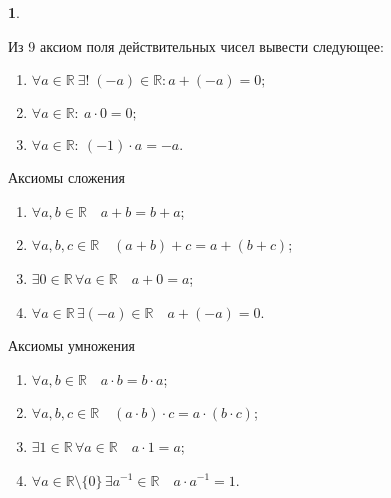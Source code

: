 \documentclass[14pt, a4paper]{extarticle}
\theoremstyle{definition}
\newtheorem{problem}{}
\theoremstyle{definition}
\theoremstyle{remark}
\numberwithin{equation}{section}
\newcommand{\R}{\ensuremath{\mathbb{R}}}
\begin{document}
\begin{problem}
    \begin{multicols}{2}
        Из 9 аксиом поля действительных чисел вывести следующее:
        {
            \renewcommand{\labelenumi}{\alph{enumi})}
            \singlespacing

            \begin{enumerate}
            \item $\forall a \in \R \ \exists ! \; (-a)\in \R : a + (-a) = 0;$
            
            \item $\forall a \in \R : \ a \cdot 0 = 0;$
            
            \item $\forall a \in \R : \ (-1) \cdot a = -a.$
            \end{enumerate}
        }

        \columnbreak

        {
            \renewcommand{\labelenumi}{\theenumi)}
            \singlespacing

            Аксиомы сложения
            \begin{enumerate}
                \item $\forall a, b \in \R \quad a + b = b + a$;
                \item $\forall a, b, c \in \R \quad (a + b) + c = a + (b + c)$;
                \item $\exists 0 \in \R \, \forall a \in \R \quad a + 0 = a$;
                \item $\forall a \in \R \, \exists (-a) \in \R \quad a + (-a) = 0$.

                \setcounter{axiomscounter}{\theenumi}
            \end{enumerate}

            Аксиомы умножения
            \begin{enumerate}
                \setcounter{enumi}{\theaxiomscounter}

                \item $\forall a, b \in \R \quad a \cdot b = b \cdot a$;
                \item $\forall a, b, c \in \R \quad (a \cdot b) \cdot c = a \cdot (b \cdot c)$;
                \item $\exists 1 \in \R \, \forall a \in \R \quad a \cdot 1 = a$;
                \item $\forall a \in \R \setminus \{0\} \, \exists a^{-1} \in \R \quad a \cdot a^{-1} = 1$.
                \setcounter{axiomscounter}{\theenumi}
            \end{enumerate}

}
\end{multicols}
\end{problem}
\end{document}
